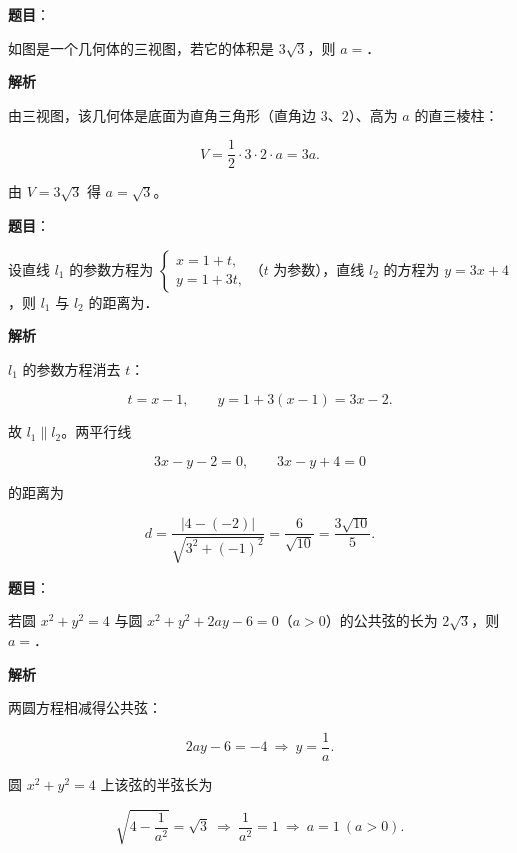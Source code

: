 \begin{answer}

\textbf{题目}：

如图是一个几何体的三视图，若它的体积是 $3\sqrt3$，则 $a=$\gkblank{}．
\nopagebreak[4]
\begin{center}\end{center}
\nopagebreak[4]
\textbf{解析}

由三视图，该几何体是底面为直角三角形（直角边 $3$、$2$）、高为 $a$ 的直三棱柱：

\nopagebreak[4]
\[V=\frac12\cdot3\cdot2\cdot a=3a .\]

由 $V=3\sqrt3$ 得 $a=\sqrt3$。


\end{answer}
\begin{answer}

\textbf{题目}：

设直线 $l_1$ 的参数方程为 $\begin{cases}x=1+t,\\ y=1+3t,\end{cases}$（$t$ 为参数），直线 $l_2$ 的方程为 $y=3x+4$，则 $l_1$ 与 $l_2$ 的距离为\gkblank{}．

\textbf{解析}

$l_1$ 的参数方程消去 $t$：

\nopagebreak[4]
\[t=x-1,\qquad y=1+3(x-1)=3x-2 .\]

故 $l_1\parallel l_2$。两平行线

\nopagebreak[4]
\[3x-y-2=0,\qquad 3x-y+4=0\]

的距离为

\nopagebreak[4]
\[d=\frac{|4-(-2)|}{\sqrt{3^2+(-1)^2}}
=\frac6{\sqrt{10}}=\frac{3\sqrt{10}}{5} .\]


\end{answer}
\begin{answer}

\textbf{题目}：

若圆 $x^2+y^2=4$ 与圆 $x^2+y^2+2ay-6=0$（$a>0$）的公共弦的长为 $2\sqrt3$，则 $a=$\gkblank{}．

\textbf{解析}

两圆方程相减得公共弦：

\nopagebreak[4]
\[2ay-6=-4\ \Longrightarrow\ y=\frac1a .\]

圆 $x^2+y^2=4$ 上该弦的半弦长为

\nopagebreak[4]
\[\sqrt{4-\frac1{a^2}}=\sqrt3
\ \Longrightarrow\ \frac1{a^2}=1\ \Longrightarrow\ a=1\ (a>0).\]


\end{answer}
